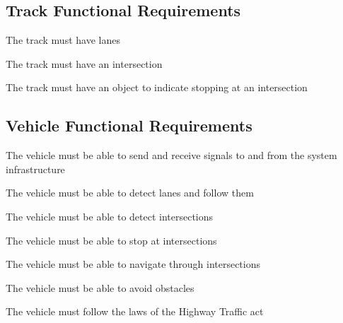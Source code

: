 \documentclass [12pt]{article}
\begin{document}
\subsection{Track Functional Requirements}
\begin{TRK}
	\setlength{\itemindent}{.5in}
	\itemsep0pt 
	\item The track must have lanes
	\item The track must have an intersection
	\item The track must have an object to indicate stopping at an intersection
\end{TRK}


\subsection{Vehicle Functional Requirements}
\begin{VHL}
	\setlength{\itemindent}{.5in}
	\itemsep0pt 
	
	\item The vehicle must be able to send and receive signals to and from the system infrastructure
	
	\item The vehicle must be able to detect lanes and follow them
    
    \item The vehicle must be able to detect intersections 
    
    \item The vehicle must be able to stop at intersections
    
    \item The vehicle must be able to navigate through intersections
    
    \item The vehicle must be able to avoid obstacles 
    
    \item The vehicle must follow the laws of the Highway Traffic act
\end{VHL}


\end{document}
